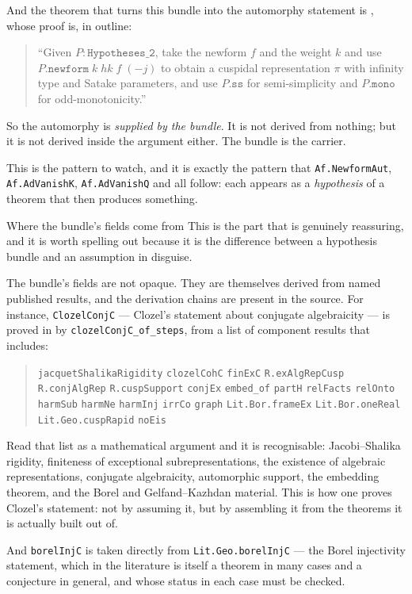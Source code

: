 And the theorem that turns this bundle into the automorphy statement is
, whose proof is, in outline:

\begin{quote}
``Given $P : \texttt{Hypotheses\_2}$, take the newform $f$ and the weight $k$
and use \textbf{$P.\texttt{newform} \; k \; hk \; f \; (-j)$} to obtain a
cuspidal representation $\pi$ with infinity type and Satake parameters, and
use $P.\texttt{ss}$ for semi-simplicity and $P.\texttt{mono}$ for
odd-monotonicity.''
\end{quote}

So the automorphy is \emph{supplied by the bundle}. It is not derived from
nothing; but it is not derived inside the argument either. The bundle is the
carrier.

This is the pattern to watch, and it is exactly the pattern that
\texttt{Af.NewformAut}, \texttt{Af.AdVanishK}, \texttt{Af.AdVanishQ} and
 all follow: each appears as a
\emph{hypothesis} of a theorem that then produces something.

\begin{seamnote}{Where the bundle's fields come from}
This is the part that is genuinely reassuring, and it is worth spelling out
because it is the difference between a hypothesis bundle and an assumption in
disguise.

The bundle's fields are not opaque. They are themselves derived from named
published results, and the derivation chains are present in the source. For
instance, \texttt{ClozelConjC} --- Clozel's statement about conjugate
algebraicity --- is proved in
 by
\texttt{clozelConjC\_of\_steps}, from a list of component results that
includes:

\begin{quote}
\small
\texttt{jacquetShalikaRigidity} \quad
\texttt{clozelCohC} \quad
\texttt{finExC} \quad
\texttt{R.exAlgRepCusp} \quad
\texttt{R.conjAlgRep} \quad
\texttt{R.cuspSupport} \quad
\texttt{conjEx} \quad
\texttt{embed\_of} \quad
\texttt{partH} \quad
\texttt{relFacts} \quad
\texttt{relOnto} \quad
\texttt{harmSub} \quad
\texttt{harmNe} \quad
\texttt{harmInj} \quad
\texttt{irrCo} \quad
\texttt{graph} \quad
\texttt{Lit.Bor.frameEx} \quad
\texttt{Lit.Bor.oneReal} \quad
\texttt{Lit.Geo.cuspRapid} \quad
\texttt{noEis}
\end{quote}

Read that list as a mathematical argument and it is recognisable: Jacobi--Shalika
rigidity, finiteness of exceptional subrepresentations, the existence of
algebraic representations, conjugate algebraicity, automorphic support, the
embedding theorem, and the Borel and Gelfand--Kazhdan material. This is how
one proves Clozel's statement: not by assuming it, but by assembling it from
the theorems it is actually built out of.

And \texttt{borelInjC} is taken directly from
\texttt{Lit.Geo.borelInjC} --- the Borel injectivity statement, which in the
literature is itself a theorem in many cases and a conjecture in general, and
whose status in each case must be checked.
\end{seamnote}

